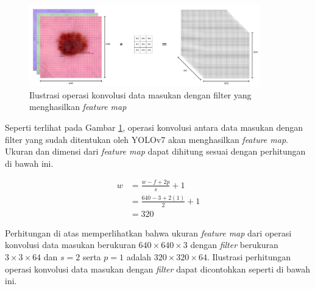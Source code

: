     \begin{figure}[H]
        \centering
            \includegraphics[width=10cm]{img/bab4/convolution.png}
        \caption{Ilustrasi operasi konvolusi data masukan dengan filter yang menghasilkan \textit{feature map}}
        \label{fig:d-convol}
    \end{figure}

    Seperti terlihat pada Gambar \ref{fig:d-convol}, operasi konvolusi antara data masukan dengan filter yang sudah ditentukan oleh YOLOv7 akan menghasilkan \textit{feature map}. Ukuran dan dimensi dari \textit{feature map} dapat dihitung sesuai dengan perhitungan di bawah ini.

    \begin{align*}
        w &= \frac{w - f + 2p}{s} + 1\\
        &= \frac{640 - 3 + 2(1)}{2} + 1\\
        &= 320
    \end{align*}

    Perhitungan di atas memperlihatkan bahwa ukuran \textit{feature map} dari operasi konvolusi data masukan berukuran $640\times 640\times 3$ dengan \textit{filter} berukuran $3\times 3\times 64$ dan $s=2$ serta $p=1$ adalah $320\times 320\times 64$. Ilustrasi perhitungan operasi konvolusi data masukan dengan \textit{filter} dapat dicontohkan seperti di bawah ini.


